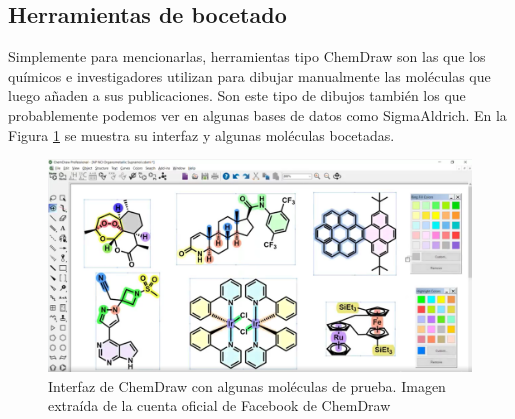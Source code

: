 \subsection{Herramientas de bocetado}
Simplemente para mencionarlas, herramientas tipo ChemDraw \cite{chemdraw_page} son las que los químicos e investigadores utilizan para dibujar manualmente las moléculas que luego añaden a sus publicaciones. Son este tipo de dibujos también los que probablemente podemos ver en algunas bases de datos como SigmaAldrich. En la Figura \ref{fig:chemdraw} se muestra su interfaz y algunas moléculas bocetadas.

\begin{figure}[h!]
    \centering
    \includegraphics[scale=0.34]{imagenes/estado_arte/chemdraw.png}
    \caption{Interfaz de ChemDraw con algunas moléculas de prueba. Imagen extraída de la cuenta oficial de Facebook de ChemDraw\footnotemark}
    \label{fig:chemdraw}
\end{figure}



